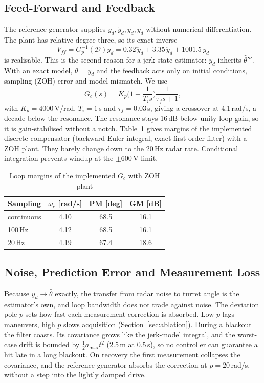 \documentclass[conference]{IEEEtran}
\newcommand{\D}{\mathcal{D}}
\begin{document}
\subsection{Feed-Forward and Feedback}
\label{sec:ff}
The reference generator supplies $y_d,\dot y_d,\ddot y_d,\dddot y_d$ without numerical differentiation. The plant has relative degree three, so its exact inverse
\begin{equation}
V_{ff}=G_p^{-1}(\D)y_d=0.32\,\dddot y_d+3.35\,\ddot y_d+1001.5\,\dot y_d
\end{equation}
is realisable. This is the second reason for a jerk-state estimator: $\dddot y_d$ inherits $\hat\theta'''$. With an exact model, $\theta=y_d$ and the feedback acts only on initial conditions, sampling (ZOH) error and model mismatch. We use
\begin{equation}
G_c(s)=K_p\Big(1+\frac{1}{T_is}\Big)\frac{1}{\tau_fs+1},
\end{equation}
with $K_p=4000$\,V/rad, $T_i=1$\,s and $\tau_f=0.03$\,s, giving a crossover at 4.1\,rad/s, a decade below the resonance. The resonance stays 16\,dB below unity loop gain, so it is gain-stabilised without a notch. Table~\ref{tab:margins} gives margins of the implemented discrete compensator (backward-Euler integral, exact first-order filter) with a ZOH plant. They barely change down to the 20\,Hz radar rate. Conditional integration prevents windup at the $\pm600$\,V limit.

\begin{table}[t]
\centering
\caption{Loop margins of the implemented $G_c$ with ZOH plant}
\label{tab:margins}
\begin{tabular}{lccc}
\toprule
Sampling & $\omega_c$ [rad/s] & PM [deg] & GM [dB] \\
\midrule
continuous & 4.10 & 68.5 & 16.1\\
100\,Hz & 4.12 & 68.5 & 16.1\\
20\,Hz & 4.19 & 67.4 & 18.6\\
\bottomrule
\end{tabular}
\end{table}

\subsection{Noise, Prediction Error and Measurement Loss}
Because $y_d\to\hat\theta$ exactly, the transfer from radar noise to turret angle is the estimator's own, and loop bandwidth does not trade against noise. The deviation pole $p$ sets how fast each measurement correction is absorbed. Low $p$ lags maneuvers, high $p$ slows acquisition (Section~\ref{sec:ablation}). During a blackout the filter coasts. Its covariance grows like the jerk-model integral, and the worst-case drift is bounded by $\tfrac12a_{\max}t^2$ (2.5\,m at 0.5\,s), so no controller can guarantee a hit late in a long blackout. On recovery the first measurement collapses the covariance, and the reference generator absorbs the correction at $p=20$\,rad/s, without a step into the lightly damped drive.
\end{document}
